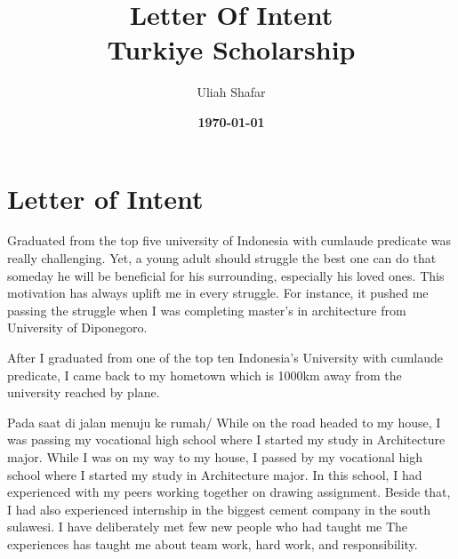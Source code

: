 \documentclass[12pt]{simart} %
\title{
\textbf{Letter Of Intent}\\
{Turkiye Scholarship} \\
} %
\date{\textbf{\today}}
\author{Uliah Shafar}
\begin{document}
\maketitle %

\vspace{30pt} %

\section{Letter of Intent}


Graduated from the top five university of Indonesia with cumlaude predicate was really challenging. Yet, a young adult should struggle the best one can do that someday he will be  beneficial for his surrounding, especially his loved ones.
This motivation has always uplift me in every struggle. For instance, it pushed me passing the struggle when I was completing master's in architecture from University of Diponegoro.

After I graduated from one of the top ten Indonesia's University with cumlaude predicate, I came back to my hometown which is 1000km away from the university reached by plane.

Pada saat di jalan menuju ke rumah/ While on the road headed to my house, I was passing my vocational high school where I started my study in Architecture major.
While I was on my way to my house, I passed by my vocational high school where I started my study in Architecture major.
In this school, I had experienced with my peers working together on drawing assignment.
Beside that, I had also experienced internship in the biggest cement company in the south sulawesi. I have deliberately met few new people who had taught me
The experiences has taught me about team work, hard work, and responsibility.
\end{document}
